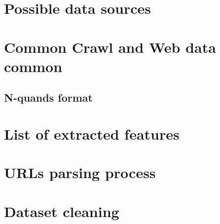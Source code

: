 \section{Possible data sources}
\label{sec:datasource}
\section{Common Crawl and Web data common}
\subsection{N-quands format}
\label{subsec:nquand}
\section{List of extracted features}
\label{sec:features}
\section{URLs parsing process}
\label{sec:urlparse}
\section{Dataset cleaning}
\label{sec:dataclean}